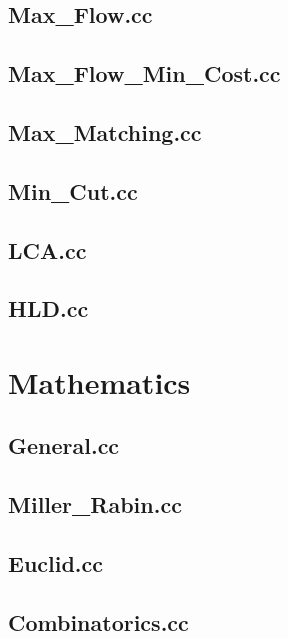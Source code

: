 \subsection{Max\_Flow.cc}

\subsection{Max\_Flow\_Min\_Cost.cc}

\subsection{Max\_Matching.cc}

\subsection{Min\_Cut.cc}

\subsection{LCA.cc}

\subsection{HLD.cc}

\section{Mathematics}
\subsection{General.cc}

\subsection{Miller\_Rabin.cc}

\subsection{Euclid.cc}

\subsection{Combinatorics.cc}

